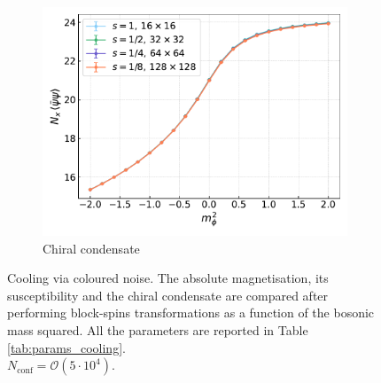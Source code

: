 \begin{figure}[hbp]
\begin{subfigure}[b]{0.47\textwidth}
        \includegraphics[width=\textwidth]{figures/cooling/mass_scan/condensate.pdf}
        \caption{Chiral condensate}
    \end{subfigure}
    \caption[Cooling stochastic quantisation: fields as a function of the bosonic mass squared.]{Cooling via coloured noise. The absolute magnetisation, its susceptibility and the chiral condensate are compared after performing block-spins transformations as a function of the bosonic mass squared. All the parameters are reported in  Table \ref{tab:params_cooling}. \\ $N_\text{conf} = \mathcal{O}(5 \cdot 10^4)$.}
    \label{fig:cooling_M_psibarpsi_chi2}
\end{figure}

